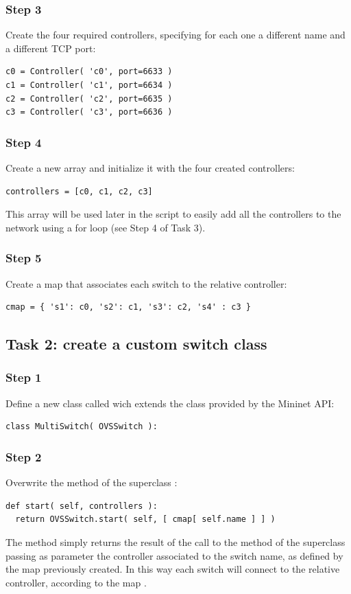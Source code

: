 \subsubsection*{Step 3}
Create the four required controllers, specifying for each one a different name and
a different TCP port:
\begin{lstlisting}
c0 = Controller( 'c0', port=6633 )
c1 = Controller( 'c1', port=6634 )
c2 = Controller( 'c2', port=6635 )
c3 = Controller( 'c3', port=6636 )
\end{lstlisting}

\subsubsection*{Step 4}
Create a new array and initialize it with the four created controllers:
\begin{lstlisting}
controllers = [c0, c1, c2, c3]
\end{lstlisting}
This array will be used later in the script to easily add all the controllers
to the network using a for loop (see Step 4 of Task 3).

\subsubsection*{Step 5}
Create a map that associates each switch to the relative controller:
\begin{lstlisting}
cmap = { 's1': c0, 's2': c1, 's3': c2, 's4' : c3 }
\end{lstlisting}






\subsection*{Task 2: create a custom switch class}
\subsubsection*{Step 1}
Define a new class called  wich extends the class
 provided by the Mininet API:
\begin{lstlisting}
class MultiSwitch( OVSSwitch ):
\end{lstlisting}

\subsubsection*{Step 2}
Overwrite the method  of the superclass :
\begin{lstlisting}
def start( self, controllers ):
  return OVSSwitch.start( self, [ cmap[ self.name ] ] )
\end{lstlisting}
The method simply returns the result of the call to the method  of the
superclass passing as parameter the controller associated to the switch name, as defined by
the map  previously created. In this way each switch will connect to
the relative controller, according to the map .






